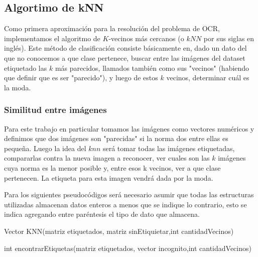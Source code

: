 \subsection{Algortimo de kNN}
Como primera aproximación para la resolución del problema de OCR, implementamos el algoritmo de $K$-vecinos más cercanos (o $kNN$ por sus siglas en inglés). Este método de clasificación consiste básicamente en, dado un dato del que no conocemos a que clase pertenece, buscar entre las imágenes del dataset etiquetado las $k$ más parecidos, llamados también como sus "vecinos" (habiendo que definir que es ser "parecido"), y luego de estos $k$ vecinos, determinar cuál es la moda. 
\\
\subsubsection{Similitud entre imágenes}
Para este trabajo en particular tomamos las imágenes como vectores numéricos y definimos que dos imágenes son "parecidas" si la norma dos entre ellas es pequeña. Luego la idea del $knn$ será tomar todas las imágenes etiquetadas, compararlas contra la nueva imagen a reconocer, ver cuales son las $k$ imágenes cuya norma es la menor posible y, entre esos k vecinos, ver a que clase pertenecen. La etiqueta para esta imagen vendrá dada por la moda.

Para los siguientes pseudocódigos será necesario asumir que todas las estructuras utilizadas almacenan datos enteros a menos que se indique lo contrario, esto se indica agregando entre paréntesis el tipo de dato que almacena.
\\
\begin{algorithm}
\begin{algorithmic}[1]\parskip=1mm
\caption{Vector KNN(matriz etiquetados, matriz sinEtiquietar,int cantidadVecinos)}
\ENDFOR
{}
\end{algorithmic}
\end{algorithm}

\begin{algorithm}
\begin{algorithmic}[1]\parskip=1mm
\caption{int encontrarEtiquetas(matriz etiquetados, vector incognito,int cantidadVecinos)}
\ENDFOR
{}
\ENDWHILE\\
\end{algorithmic}
\end{algorithm}

